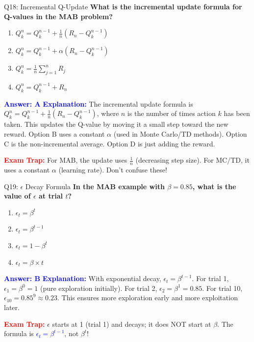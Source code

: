 \documentclass[8pt]{beamer}
\begin{document}
	\begin{frame}{Q18: Incremental Q-Update}
		\fontsize{6.5}{7.5}\selectfont
		\textbf{What is the incremental update formula for Q-values in the MAB problem?}
		
		\begin{enumerate}
			\item $Q_k^n = Q_k^{n-1} + \frac{1}{n}(R_n - Q_k^{n-1})$
			\item $Q_k^n = Q_k^{n-1} + \alpha(R_n - Q_k^{n-1})$
			\item $Q_k^n = \frac{1}{n}\sum_{j=1}^n R_j$
			\item $Q_k^n = Q_k^{n-1} + R_n$
		\end{enumerate}
		
		\vspace{0.1cm}
		\textcolor{blue}{\textbf{Answer: A}}
		\vspace{0.1cm}
		\textcolor{blue}{\textbf{Explanation:}} The incremental update formula is $Q_k^n = Q_k^{n-1} + \frac{1}{n}(R_n - Q_k^{n-1})$, where $n$ is the number of times action $k$ has been taken. This updates the Q-value by moving it a small step toward the new reward. Option B uses a constant $\alpha$ (used in Monte Carlo/TD methods). Option C is the non-incremental average. Option D is just adding the reward.
		
		\textcolor{red}{\textbf{Exam Trap:}} For MAB, the update uses $\frac{1}{n}$ (decreasing step size). For MC/TD, it uses a constant $\alpha$ (learning rate). Don't confuse these!
	\end{frame}
	
	\begin{frame}{Q19: $\epsilon$ Decay Formula}
		\fontsize{6.5}{7.5}\selectfont
		\textbf{In the MAB example with $\beta = 0.85$, what is the value of $\epsilon$ at trial $t$?}
		
		\begin{enumerate}
			\item $\epsilon_t = \beta^t$
			\item $\epsilon_t = \beta^{t-1}$
			\item $\epsilon_t = 1 - \beta^t$
			\item $\epsilon_t = \beta \times t$
		\end{enumerate}
		
		\vspace{0.1cm}
		\textcolor{blue}{\textbf{Answer: B}}
		\vspace{0.1cm}
		\textcolor{blue}{\textbf{Explanation:}} With exponential decay, $\epsilon_t = \beta^{t-1}$. For trial 1, $\epsilon_1 = \beta^0 = 1$ (pure exploration initially). For trial 2, $\epsilon_2 = \beta^1 = 0.85$. For trial 10, $\epsilon_{10} = 0.85^9 \approx 0.23$. This ensures more exploration early and more exploitation later.
		
		\textcolor{red}{\textbf{Exam Trap:}} $\epsilon$ starts at 1 (trial 1) and decays; it does NOT start at $\beta$. The formula is \textcolor{blue}{$\epsilon_t = \beta^{t-1}$}, not $\beta^t$!
	\end{frame}
	
\end{document}
